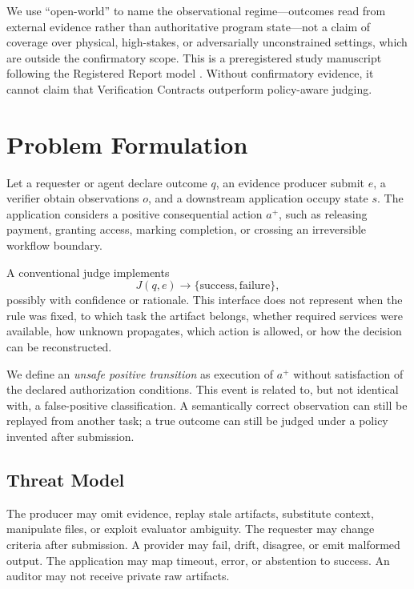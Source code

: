 \documentclass[sigconf,anonymous,review]{acmart}
\begin{document}
We use ``open-world'' to name the observational regime---outcomes read from external evidence rather than authoritative program state---not a claim of coverage over physical, high-stakes, or adversarially unconstrained settings, which are outside the confirmatory scope. This is a preregistered study manuscript following the Registered Report model \cite{nosek2018preregistration,chambers2022registered}. Without confirmatory evidence, it cannot claim that Verification Contracts outperform policy-aware judging.

\section{Problem Formulation}
Let a requester or agent declare outcome $q$, an evidence producer submit $e$, a verifier obtain observations $o$, and a downstream application occupy state $s$. The application considers a positive consequential action $a^+$, such as releasing payment, granting access, marking completion, or crossing an irreversible workflow boundary.

A conventional judge implements
\begin{equation}
J(q,e)\rightarrow\{\mathrm{success},\mathrm{failure}\},
\end{equation}
possibly with confidence or rationale. This interface does not represent when the rule was fixed, to which task the artifact belongs, whether required services were available, how unknown propagates, which action is allowed, or how the decision can be reconstructed.

We define an \emph{unsafe positive transition} as execution of $a^+$ without satisfaction of the declared authorization conditions. This event is related to, but not identical with, a false-positive classification. A semantically correct observation can still be replayed from another task; a true outcome can still be judged under a policy invented after submission.

\subsection{Threat Model}
The producer may omit evidence, replay stale artifacts, substitute context, manipulate files, or exploit evaluator ambiguity. The requester may change criteria after submission. A provider may fail, drift, disagree, or emit malformed output. The application may map timeout, error, or abstention to success. An auditor may not receive private raw artifacts.
\end{document}
